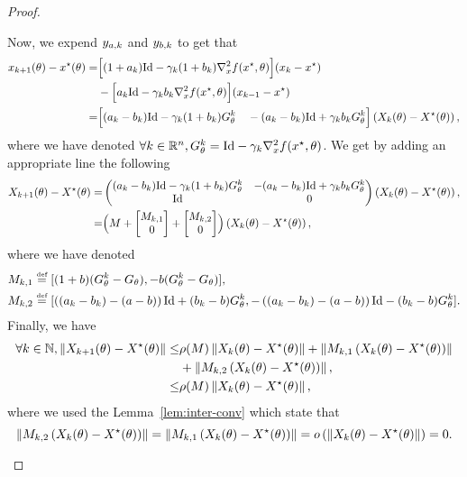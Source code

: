 \begin{appendices}
\begin{proof}
\begin{itemize}
Now, we expend $y_{a,k}$ and $y_{b,k}$ to get that  
\begin{align*}
x_{k+1}(\theta)-x^{\star}(\theta)=&\Big[(1+a_{k})\mathrm{Id}-\gamma_{k}(1+b_{k})\nabla^2_xf(x^{\star},\theta)\Big](x_{k}-x^{\star})\\&-\Big[a_{k}\mathrm{Id}-\gamma_{k}b_{k}\nabla^2_xf(x^{\star},\theta)\Big](x_{k-1}-x^{\star})\\
=&\Big[(a_{k}-b_{k})\mathrm{Id}-\gamma_{k}(1+b_{k})G^k_{\theta}\quad -(a_{k}-b_{k})\mathrm{Id}+\gamma_{k}b_{k} G^k_{\theta}\Big]\left({X_k(\theta)-X^{\star}(\theta)}\right),
\end{align*}
where we have denoted $\forall k\in\mathbb{R}^n,  G^k_{\theta}=\mathrm{Id}-\gamma_{k}\nabla^2_xf(x^{\star},\theta)$. We get by adding an appropriate line  the following
\begin{align*}
X_{k+1}(\theta)-X^{\star}(\theta)=&\begin{pmatrix}(a_{k}-b_{k})\mathrm{Id}-\gamma_{k}(1+b_{k})G^k_{\theta}&-(a_{k}-b_{k})\mathrm{Id}+\gamma_{k}b_{k} G^k_{\theta}\\
\mathrm{Id}&0
\end{pmatrix}\left({X_k(\theta)-X^{\star}(\theta)}\right),\\
=&\Big({M+\begin{bmatrix}M_{k,1}\\0\end{bmatrix}+\begin{bmatrix}M_{k,2}\\0\end{bmatrix}}\Big)\left({X_k(\theta)-X^{\star}(\theta)}\right),
\end{align*}
where we have denoted 
\begin{align*}
&M_{k,1}\stackrel{\text{\rm\tiny def}}{=}[(1+b)(G^k_{\theta}-G_{\theta}),-b(G^k_{\theta}-G_{\theta})],\\
&M_{k,2}\stackrel{\text{\rm\tiny def}}{=}[\left({(a_{k}-b_{k})-(a-b)}\right)\mathrm{Id}+(b_{k}-b)G^k_{\theta},-\left({(a_{k}-b_{k})-(a-b)}\right)\mathrm{Id}-(b_{k}-b)G^k_{\theta}].
\end{align*}
Finally, we have 
\begin{align*}
\forall k\in\mathbb{N},\left\Vert {X_{k+1}(\theta)-X^{\star}(\theta)} \right\Vert\leq &\rho(M)\left\Vert {X_{k}(\theta)-X^{\star}(\theta)} \right\Vert+\left\Vert {M_{k,1}\left({X_{k}(\theta)-X^{\star}(\theta)}\right)} \right\Vert\\
&+\left\Vert {M_{k,2}\left({X_{k}(\theta)-X^{\star}(\theta)}\right)} \right\Vert,\\
\leq& \rho(M)\left\Vert {X_{k}(\theta)-X^{\star}(\theta)} \right\Vert,
\end{align*}
where we used the Lemma~\ref{lem:inter-conv} which state that 
\[
\left\Vert {M_{k,2}\left({X_{k}(\theta)-X^{\star}(\theta)}\right)} \right\Vert=\left\Vert {M_{k,1}\left({X_{k}(\theta)-X^{\star}(\theta)}\right)} \right\Vert=o\left({\left\Vert {X_{k}(\theta)-X^{\star}(\theta)} \right\Vert}\right)=0.
\]
\end{itemize}
\end{proof}


\end{appendices}
